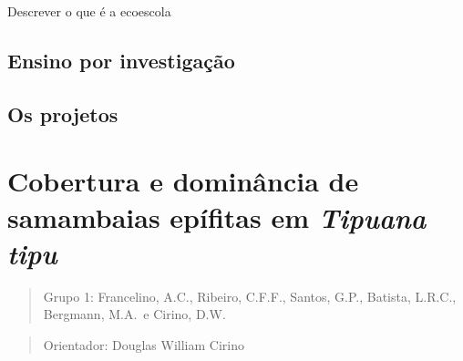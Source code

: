 \documentclass[
]{book}
\begin{document}
Descrever o que é a ecoescola

\section{Ensino por investigação}\label{ensino-por-investigauxe7uxe3o}

\section{Os projetos}\label{os-projetos}

\chapter{\texorpdfstring{Cobertura e dominância de samambaias epífitas em \emph{Tipuana tipu}}{Cobertura e dominância de samambaias epífitas em Tipuana tipu}}\label{cobertura-e-dominuxe2ncia-de-samambaias-epuxedfitas-em-tipuana-tipu}

\begin{quote}
Grupo 1: Francelino, A.C., Ribeiro, C.F.F., Santos, G.P., Batista, L.R.C., Bergmann, M.A.~e Cirino, D.W.
\end{quote}

\begin{quote}
Orientador: Douglas William Cirino
\end{quote}
\end{document}
